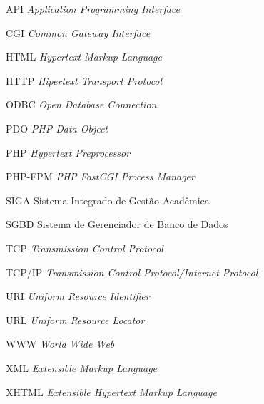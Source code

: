 \begin{siglas}
  \item[API] \textit{Application Programming Interface}
  \item[CGI] \textit{Common Gateway Interface}
  \item[HTML] \textit{Hypertext Markup Language}
  \item[HTTP] \textit{Hipertext Transport Protocol}
  \item[ODBC] \textit{Open Database Connection}
  \item[PDO] \textit{PHP Data Object}
  \item[PHP] \textit{Hypertext Preprocessor}
  \item[PHP-FPM] \textit{PHP FastCGI Process Manager}
  \item[SIGA] Sistema Integrado de Gestão Acadêmica
  \item[SGBD] Sistema de Gerenciador de Banco de Dados
  \item[TCP] \textit{Transmission Control Protocol}
  \item[TCP/IP] \textit{Transmission Control Protocol/Internet Protocol	}
  \item[URI] \textit{Uniform Resource Identifier}
  \item[URL] \textit{Uniform Resource Locator}
  \item[WWW] \textit{World Wide Web}
  \item[XML] \textit{Extensible Markup Language}
  \item[XHTML] \textit{Extensible Hypertext Markup Language}
\end{siglas}